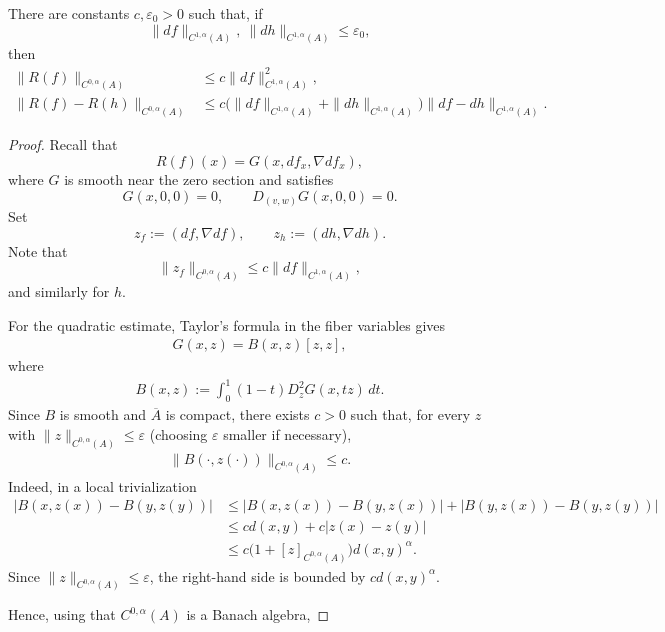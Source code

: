 \documentclass[10pt,a4paper]{amsart}
\begin{document}
\begin{lemma}\label{lem:fixed-annulus-R}
There are constants \(c,\varepsilon_0>0\) such that, if
\[
    \|df\|_{C^{1,\alpha}(A)},\ \|dh\|_{C^{1,\alpha}(A)}
    \le \varepsilon_0,
\]
then
\begin{align}
    \|R(f)\|_{C^{0,\alpha}(A)}
    &\le
    c\|df\|_{C^{1,\alpha}(A)}^2, \label{eq:fixed-annulus-R-quadratic}\\
    \|R(f)-R(h)\|_{C^{0,\alpha}(A)}
    &\le
    c\bigl(
        \|df\|_{C^{1,\alpha}(A)}
        +
        \|dh\|_{C^{1,\alpha}(A)}
    \bigr)
    \|df-dh\|_{C^{1,\alpha}(A)}. \label{eq:fixed-annulus-R-lipschitz}
\end{align}
\end{lemma}

\begin{proof}
Recall that
\[
    R(f)(x)=G(x,df_x,\nabla df_x),
\]
where \(G\) is smooth near the zero section and satisfies
\[
    G(x,0,0)=0,
    \qquad
    D_{(v,w)}G(x,0,0)=0.
\]
Set
\[
    z_f:=(df,\nabla df),
    \qquad
    z_h:=(dh,\nabla dh).
\]
Note that
\[
    \|z_f\|_{C^{0,\alpha}(A)}
    \le
    c\|df\|_{C^{1,\alpha}(A)},
\]
and similarly for \(h\).

For the quadratic estimate, Taylor's formula in the fiber variables gives
\begin{align}\label{eq: def-B-bilinear}
    G(x,z)=B(x,z)[z,z],
\end{align}
where
\begin{align}\label{eq: B-as-integral}
    B(x,z)
    :=
    \int_0^1(1-t)D_z^2G(x,tz)\,dt .
\end{align}
Since \(B\) is smooth and \(\overline A\) is compact, there exists \(c>0\) such that, for every
\(z\) with \(\|z\|_{C^{0,\alpha}(A)}\le \varepsilon\) (choosing $\varepsilon$ smaller if necessary),
\begin{align*}
    \|B(\cdot,z(\cdot))\|_{C^{0,\alpha}(A)}
    \le c.
\end{align*}
Indeed, in a local trivialization
\[
\begin{aligned}
|B(x,z(x))-B(y,z(y))|
&\le
|B(x,z(x))-B(y,z(x))| +
|B(y,z(x))-B(y,z(y))| \\
&\le
c d(x,y)+c|z(x)-z(y)| \\
&\le
c\bigl(1+[z]_{C^{0,\alpha}(A)}\bigr)d(x,y)^\alpha.
\end{aligned}
\]
Since \(\|z\|_{C^{0,\alpha}(A)}\le\varepsilon\), the right-hand side is bounded
by \(c d(x,y)^\alpha\).


Hence, using that
\(C^{0,\alpha}(A)\) is a Banach algebra,


\end{proof}
\end{document}
